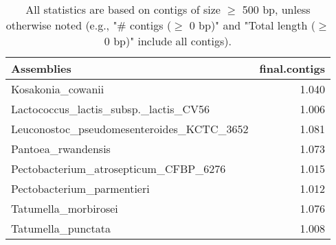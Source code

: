 \documentclass[12pt,a4paper]{article}
\begin{document}
\begin{table}[ht]
\begin{center}
\caption{All statistics are based on contigs of size $\geq$ 500 bp, unless otherwise noted (e.g., "\# contigs ($\geq$ 0 bp)" and "Total length ($\geq$ 0 bp)" include all contigs).}
\begin{tabular}{|l*{1}{|r}|}
\hline
Assemblies & final.contigs \\ \hline
Kosakonia\_cowanii & 1.040 \\ \hline
Lactococcus\_lactis\_subsp.\_lactis\_CV56 & 1.006 \\ \hline
Leuconostoc\_pseudomesenteroides\_KCTC\_3652 & 1.081 \\ \hline
Pantoea\_rwandensis & 1.073 \\ \hline
Pectobacterium\_atrosepticum\_CFBP\_6276 & 1.015 \\ \hline
Pectobacterium\_parmentieri & 1.012 \\ \hline
Tatumella\_morbirosei & 1.076 \\ \hline
Tatumella\_punctata & 1.008 \\ \hline
\end{tabular}
\end{center}
\end{table}
\end{document}
